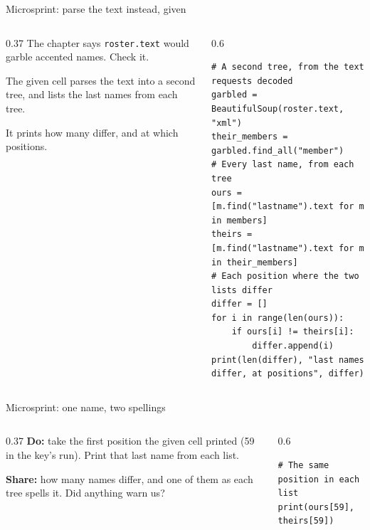 \documentclass[9pt,aspectratio=169]{beamer}
\begin{document}
\begin{frame}[fragile]{Microsprint: parse the text instead, given}
    \begin{columns}[T]
        \begin{column}{0.37\textwidth}
            The chapter says \texttt{roster.text} would garble accented names. Check it.

            \medskip
            The given cell parses the text into a second tree, and lists the last names from each tree.

            \medskip
            It prints how many differ, and at which positions.
        \end{column}
        \begin{column}{0.6\textwidth}
\begin{lstlisting}
# A second tree, from the text requests decoded
garbled = BeautifulSoup(roster.text, "xml")
their_members = garbled.find_all("member")
# Every last name, from each tree
ours = [m.find("lastname").text for m in members]
theirs = [m.find("lastname").text for m in their_members]
# Each position where the two lists differ
differ = []
for i in range(len(ours)):
    if ours[i] != theirs[i]:
        differ.append(i)
print(len(differ), "last names differ, at positions", differ)
\end{lstlisting}
        \end{column}
    \end{columns}
\end{frame}

\begin{frame}[fragile]{Microsprint: one name, two spellings}
    \begin{columns}[T]
        \begin{column}{0.37\textwidth}
            \textbf{Do:} take the first position the given cell printed (59 in the key's run). Print that last name from each list.

            \medskip
            \textbf{Share:} how many names differ, and one of them as each tree spells it. Did anything warn us?
        \end{column}
        \begin{column}{0.6\textwidth}
\begin{lstlisting}
# The same position in each list
print(ours[59], theirs[59])
\end{lstlisting}
        \end{column}
    \end{columns}
\end{frame}
\end{document}
